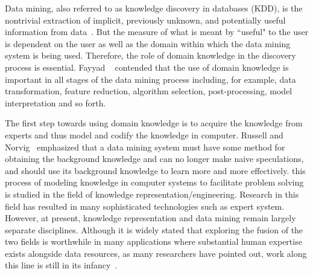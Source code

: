 \label{sec:intro}


Data mining, also referred to as knowledge discovery in databases (KDD), is the nontrivial extraction of implicit, previously unknown, and potentially useful information from data~\cite{Frawley1992}. But the measure of what is meant by ``useful" to the user is dependent on the user as well as the domain within which the data mining system is being used. Therefore, the role of domain knowledge in the discovery process is essential. Fayyad \etal~\cite{Fayyad96} contended that the use of domain knowledge is important in all stages of the data mining process including, for example, data transformation, feature reduction, algorithm selection, post-processing, model interpretation and so forth.

The first step towards using domain knowledge is to acquire the knowledge from experts and thus model and codify the knowledge in computer. Russell and Norvig~\cite{Russell03} emphasized that a data mining system must have some method for obtaining the background knowledge and can no longer make naive speculations, and should use its background knowledge to learn more and more effectively. this process of modeling knowledge in computer systems to facilitate problem solving is studied in the field of knowledge representation/engineering. Research in this field has resulted in many sophisticated technologies such as expert system. However, at present, knowledge representation and data mining remain largely separate disciplines. Although it is widely stated that exploring the fusion of the two fields is worthwhile in many applications where substantial human expertise exists alongside data resources, as many researchers have pointed out, work along this line is still in its infancy~\cite{Hirsh94, Weiss01, Daniels01, Kopanas02, Langseth03}.

